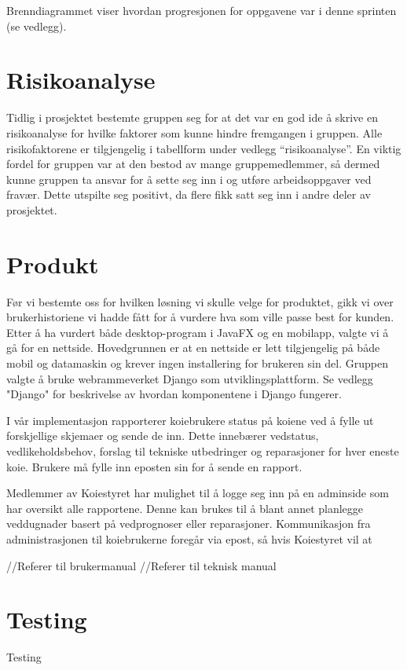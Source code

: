 \documentclass[12pt,a4paper,norsk]{article}
\begin{document}
Brenndiagrammet viser hvordan progresjonen for oppgavene var i denne sprinten (se vedlegg).

	
	\section{Risikoanalyse}
	Tidlig i prosjektet bestemte gruppen seg for at det var en god ide å skrive en risikoanalyse for hvilke faktorer som kunne hindre fremgangen i gruppen. Alle risikofaktorene er tilgjengelig i tabellform under vedlegg “risikoanalyse”. En viktig fordel for gruppen var at den bestod av mange gruppemedlemmer, så dermed kunne gruppen ta ansvar for å sette seg inn i og utføre arbeidsoppgaver ved fravær. Dette utspilte seg positivt, da flere fikk satt seg inn i andre deler av prosjektet.
	
	\section{Produkt}
	Før vi bestemte oss for hvilken løsning vi skulle velge for produktet, gikk vi over brukerhistoriene vi hadde fått for å vurdere hva som ville passe best for kunden. Etter å ha vurdert både desktop-program i JavaFX og en mobilapp, valgte vi å gå for en nettside. Hovedgrunnen er at en nettside er lett tilgjengelig på både mobil og datamaskin og krever ingen installering for brukeren sin del. Gruppen valgte å bruke webrammeverket Django som utviklingsplattform. Se vedlegg "Django" for beskrivelse av hvordan komponentene i Django fungerer.
	
	I vår implementasjon rapporterer koiebrukere status på koiene ved å fylle ut forskjellige skjemaer og sende de inn. Dette innebærer vedstatus, vedlikeholdsbehov, forslag til tekniske utbedringer og reparasjoner for hver eneste koie. Brukere må fylle inn eposten sin for å sende en rapport.
	
	Medlemmer av Koiestyret har mulighet til å logge seg inn på en adminside som har oversikt alle rapportene. Denne kan brukes til å blant annet planlegge veddugnader basert på vedprognoser eller reparasjoner. Kommunikasjon fra administrasjonen til koiebrukerne foregår via epost, så hvis Koiestyret vil at 
	
	//Referer til brukermanual
	//Referer til teknisk manual
	
	\section{Testing}
	Testing
\end{document}
